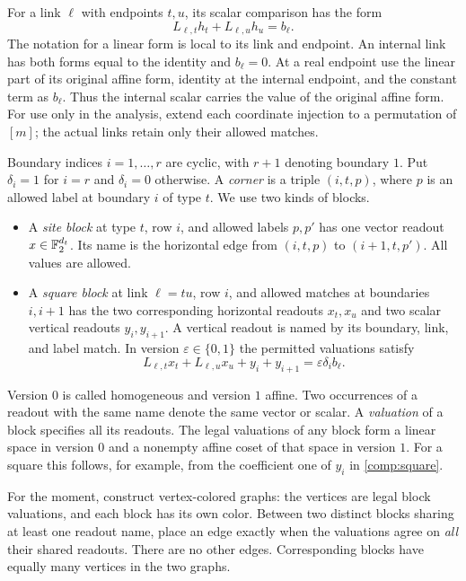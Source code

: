 For a link $\ell$ with endpoints $t,u$, its scalar comparison has the form
\begin{equation}\label{comp:link}
                         L_{\ell,t}h_t+L_{\ell,u}h_u=b_\ell.
\end{equation}
The notation for a linear form is local to its link and endpoint.  An
internal link has both forms equal to the identity and $b_\ell=0$.
At a real endpoint use the linear part of its original affine form,
identity at the internal endpoint, and the constant term as $b_\ell$.
Thus the internal scalar carries the value of the original affine form.
For use only in the analysis, extend each coordinate injection to a
permutation of $[m]$; the actual links retain only their allowed matches.

Boundary indices $i=1,\ldots,r$ are cyclic, with $r+1$ denoting boundary
$1$.  Put $\delta_i=1$ for $i=r$ and $\delta_i=0$ otherwise.  A
\emph{corner} is a triple $(i,t,p)$, where $p$ is an allowed label at
boundary $i$ of type $t$.  We use two kinds of blocks.
\begin{itemize}
\item A \emph{site block} at type $t$, row $i$, and allowed labels $p,p'$
  has one vector readout $x\in\mathbb{F}_2^{d_t}$.  Its name is the horizontal
  edge from $(i,t,p)$ to $(i+1,t,p')$.  All values are allowed.
\item A \emph{square block} at link $\ell=tu$, row $i$, and allowed
  matches at boundaries $i,i+1$ has the two corresponding horizontal
  readouts $x_t,x_u$ and two scalar vertical readouts $y_i,y_{i+1}$.
  A vertical readout is named by its boundary, link, and label match.
  In version $\varepsilon\in\{0,1\}$ the permitted valuations satisfy
  \begin{equation}\label{comp:square}
   L_{\ell,t}x_t+L_{\ell,u}x_u+y_i+y_{i+1}
                           =\varepsilon\delta_i b_\ell.
  \end{equation}
\end{itemize}
Version $0$ is called homogeneous and version $1$ affine.  Two occurrences
of a readout with the same name denote the same vector or scalar.  A
\emph{valuation} of a block specifies all its readouts.  The legal
valuations of any block form a linear space in version $0$ and a
nonempty affine coset of that space in version $1$.  For a square this
follows, for example, from the coefficient one of $y_i$ in
\eqref{comp:square}.

For the moment, construct vertex-colored graphs: the vertices are legal
block valuations, and each block has its own color.  Between two distinct
blocks sharing at least one readout name, place an edge exactly when
the valuations agree on \emph{all} their shared readouts.  There are no
other edges.  Corresponding blocks have equally many vertices in the
two graphs.

